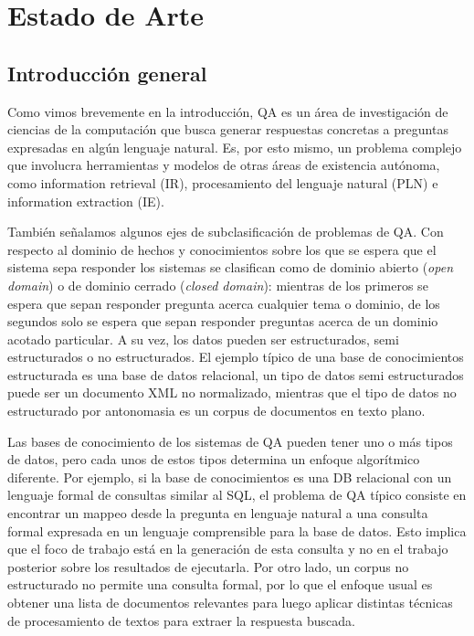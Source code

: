 \chapter{Estado de Arte}
\label{chap:estado-de-arte}
\section{Introducción general}
\label{sec:intro-general-qa}
Como vimos brevemente en la introducción, QA es un área de investigación de ciencias de la computación que busca generar respuestas concretas a preguntas expresadas en algún lenguaje natural. Es, por esto mismo, un problema complejo que involucra herramientas y modelos de otras áreas de existencia autónoma, como information retrieval (IR), procesamiento del lenguaje natural (PLN) e information extraction (IE). 

También señalamos algunos ejes de subclasificación de problemas de QA. Con respecto al dominio de hechos y conocimientos sobre los que se espera que el sistema sepa responder los sistemas se clasifican como de dominio abierto (\textit{open domain}) o de dominio cerrado (\textit{closed domain}): mientras de los primeros se espera que sepan responder pregunta acerca cualquier tema o dominio, de los segundos solo se espera que sepan responder preguntas acerca de un dominio acotado particular. A su vez, los datos pueden ser estructurados, semi estructurados o no estructurados. El ejemplo típico de una base de conocimientos estructurada es una base de datos relacional, un tipo de datos semi estructurados puede ser un documento XML no normalizado, mientras que el tipo de datos no estructurado por antonomasia es un corpus de documentos en texto plano. 

Las bases de conocimiento de los sistemas de QA pueden tener uno o más tipos de datos, pero cada unos de estos tipos determina un enfoque algorítmico diferente. Por ejemplo, si la base de conocimientos es una DB relacional con un lenguaje formal de consultas similar al SQL, el problema de QA típico consiste en encontrar un mappeo desde la pregunta en lenguaje natural a una consulta formal expresada en un lenguaje comprensible para la base de datos. Esto implica que el foco de trabajo está en la generación de esta consulta y no en el trabajo posterior sobre los resultados de ejecutarla. Por otro lado, un corpus no estructurado no permite una consulta formal, por lo que el enfoque usual es obtener una lista de documentos relevantes para luego aplicar distintas técnicas de procesamiento de textos para extraer la respuesta buscada. 


